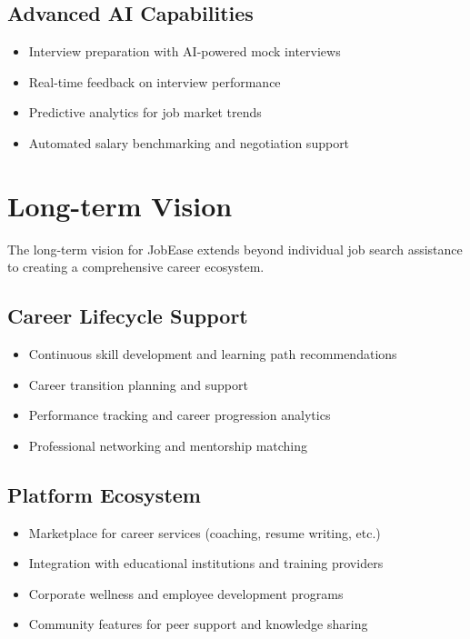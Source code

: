 \documentclass[12pt,a4paper]{report}
\begin{document}
\subsection{Advanced AI Capabilities}
\begin{itemize}[leftmargin=2em]
  \item Interview preparation with AI-powered mock interviews
  \item Real-time feedback on interview performance
  \item Predictive analytics for job market trends
  \item Automated salary benchmarking and negotiation support
\end{itemize}

\section{Long-term Vision}
The long-term vision for JobEase extends beyond individual job search assistance to creating a comprehensive career ecosystem.

\subsection{Career Lifecycle Support}
\begin{itemize}[leftmargin=2em]
  \item Continuous skill development and learning path recommendations
  \item Career transition planning and support
  \item Performance tracking and career progression analytics
  \item Professional networking and mentorship matching
\end{itemize}

\subsection{Platform Ecosystem}
\begin{itemize}[leftmargin=2em]
  \item Marketplace for career services (coaching, resume writing, etc.)
  \item Integration with educational institutions and training providers
  \item Corporate wellness and employee development programs
  \item Community features for peer support and knowledge sharing
\end{itemize}
\end{document}
